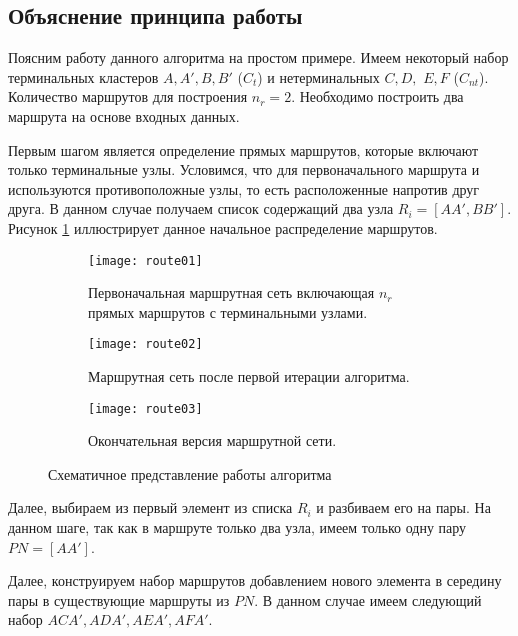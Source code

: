 \subsection{Объяснение принципа работы}
Поясним работу данного алгоритма на простом примере. Имеем некоторый набор терминальных кластеров 
\( A, A', B, B' \) (\( C_t \)) и нетерминальных \( C, D, \) \( E, F \) (\( C_{nt} \)). Количество маршрутов 
для построения \( n_r = 2 \). Необходимо построить два маршрута на основе входных данных.

Первым шагом является определение прямых маршрутов, которые включают только терминальные узлы. Условимся, 
что для первоначального маршрута и используются противоположные узлы, то есть расположенные напротив друг 
друга. В данном случае получаем список содержащий два узла \( R_i = [AA', BB'] \). Рисунок 
\ref{fig:route_first} иллюстрирует данное начальное распределение маршрутов.

\begin{figure}[ht!]
    \centering
    \begin{subfigure}{0.3\textwidth}
        \centering
        \texttt{[image: route01]}
        \caption{Первоначальная маршрутная сеть включающая \( n_r \) прямых маршрутов с терминальными узлами.}
        \label{fig:route_first}
    \end{subfigure}
    \begin{subfigure}{0.3\textwidth}
        \centering
        \texttt{[image: route02]}
        \caption{Маршрутная сеть после первой итерации алгоритма.}
        \label{fig:route_second}
    \end{subfigure}
    \begin{subfigure}{0.3\textwidth}
        \centering
        \texttt{[image: route03]}
        \caption{Окончательная версия маршрутной сети.}
        \label{fig:route_third}
    \end{subfigure}
    \caption{Схематичное представление работы алгоритма}
    \label{fig:route}
\end{figure}

Далее, выбираем из первый элемент из списка \( R_i \) и разбиваем его на пары. На данном шаге, так как в 
маршруте только два узла, имеем только одну пару \( PN = [AA'] \).

Далее, конструируем набор маршрутов добавлением нового элемента в середину пары в существующие маршруты из 
\( PN \). В данном случае имеем следующий набор \( ACA', ADA', AEA', AFA' \).

